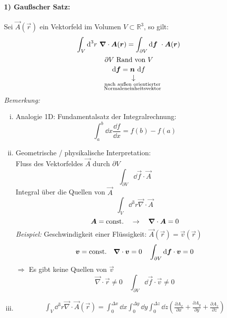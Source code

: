 \paragraph{1) Gaußscher Satz:} 
Sei $\vec{A}(\vec{r})$ ein Vektorfeld im Volumen $V \subset \mathbb R^3$, so gilt:
$$\int_V \textrm{d}^3r\ \bm{\nabla} \cdot \bm{A}(\bm{r}) = \int_{\partial V} \textrm{d}\bm{f}\ \cdot \bm{A}(\bm{r})$$
$$\partial V \textrm{ Rand von } V$$
$$\dd \vec{f} = \custo{\rightarrow}{\vec{n}}{\mathclap{\substack{\textrm{nach außen orientierter} \\ \tx{Normaleneinheitsvektor}}}}\ \dd f$$
%
%
%
%
%
%
\noindent
\emph{Bemerkung:}\\
\begin{enumerate}[i)]
	\item Analogie 1D: Fundamentalsatz der Integralrechnung:
	\begin{equation*}
	\int_{a}^{b} \dd x \frac{\dd f}{\dd x} = f(b) - f(a)
	\end{equation*}
	\item Geometrische / physikalische Interpretation:\\
	Fluss des Vektorfeldes $ \vec{A} $ durch $ \partial V $
	\begin{equation*}
	\int_{\partial V} \dd\vec{f} \cdot \vec{A}
	\end{equation*}
	Integral über die Quellen von $ \vec{A} $
	\begin{equation*}
	\int_V \dd^3r \vec{\nabla} \cdot \vec{A}
	\end{equation*}
	\begin{equation*}
	\bm{A} = \textrm{const.} \quad \rightarrow \quad \bm{\nabla} \cdot \bm{A} = 0
	\end{equation*}
	\emph{Beispiel:} Geschwindigkeit einer Flüssigkeit: $ \vec{A}(\vec{r}) = \vec{v}(\vec{r}) $\\
	$$ \bm{v} = \textrm{const.} \quad \bm{\nabla} \cdot \bm{v} = 0 \quad \int_{\partial V} \textrm{d}\bm{f} \cdot \bm{v} = 0 $$
	$ \Rightarrow $ Es gibt keine Quellen von $ \vec{v} $
	$$ \vec{\nabla} \cdot \vec{r} \neq 0 \quad \int_{\partial V} \dd\vec{f} \cdot \vec{v} \neq 0 $$
	\item
	\begin{align*}
	\int_V \dd^3r \vec{\nabla} \cdot \vec{A}(\vec{r})  =  \int_{0}^{\Delta x} \dd x \int_{0}^{\Delta y} \dd y \int_{0}^{\Delta z} \dd z \left(\frac{\partial A_x}{\partial x} + \frac{\partial A_y}{\partial y} + \frac{\partial A_z}{\partial z}\right)  \\

\end{align*}
\end{enumerate}
